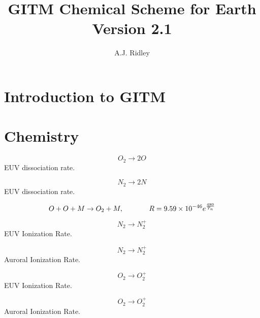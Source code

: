 \documentclass[twoside,10pt]{book}
\title{GITM Chemical Scheme for Earth  \\ \large Version 2.1}
\author{A.J. Ridley}
\begin{document}
\pagestyle{fancy}
\lhead[\fancyplain{}{\bfseries\thepage}]{\fancyplain{}{\bfseries\rightmark}}
\rhead[\fancyplain{}{\bfseries\leftmark}]{\fancyplain{}{\bfseries\thepage}}
\cfoot{}


\maketitle

\tableofcontents

\clearpage

\chapter{Introduction to GITM}

\label{intro.ch}

\chapter{Chemistry}
\label{chemistry.ch}

\begin{equation}
O_2 \rightarrow 2O
\end{equation}
EUV dissociation rate.

\begin{equation}
N_2 \rightarrow 2N
\end{equation}
EUV dissociation rate.

\begin{equation}
O + O + M \rightarrow O_2 + M, \hspace{0.5 in}
R = 9.59 \times 10^{-46} e^{\frac{480}{T_n}}
\end{equation}

\begin{equation}
N_2 \rightarrow N_2^+
\end{equation}
EUV Ionization Rate.

\begin{equation}
N_2 \rightarrow N_2^+
\end{equation}
Auroral Ionization Rate.

\begin{equation}
O_2 \rightarrow O_2^+
\end{equation}
EUV Ionization Rate.

\begin{equation}
O_2 \rightarrow O_2^+
\end{equation}
Auroral Ionization Rate.
\end{document}
